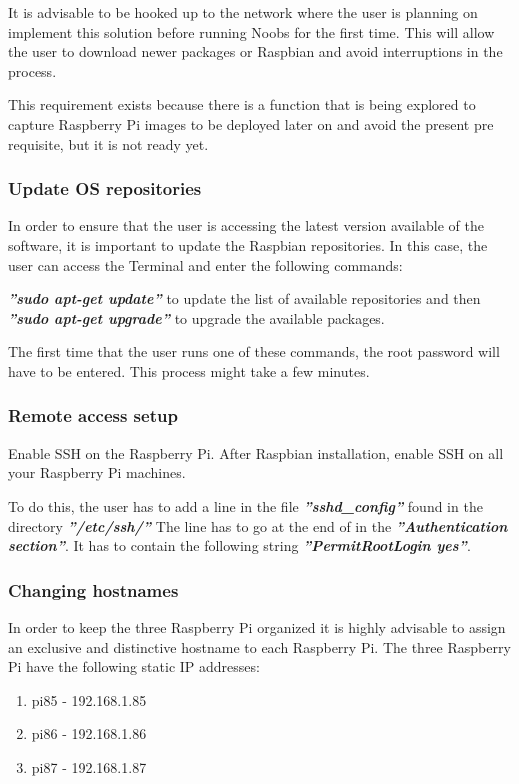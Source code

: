 	It is advisable to be hooked up to the network where the user is planning on implement this solution before running Noobs for the first time. This will allow the user to download newer packages or Raspbian and avoid interruptions in the process.	
		
	This requirement exists because there is a function that is being explored to capture Raspberry Pi images to be deployed later on and avoid the present pre requisite, but it is not ready yet.
	
	\subsubsection{Update OS repositories}
	In order to ensure that the user is accessing the latest version available of the software, it is important to update the Raspbian repositories. 
	In this case, the user can access the Terminal and enter the following commands:
	
		\textbf{\textit{''sudo apt-get update''}} to update the list of available repositories
	and then 	\textbf{\textit{''sudo apt-get upgrade''}} to upgrade the available packages.
	
	The first time that the user runs one of these commands, the root password will have to be entered.
	This process might take a few minutes. \cite{debianpackage}
	
	\subsubsection{Remote access setup}
	Enable SSH on the Raspberry Pi.
	After Raspbian installation, enable SSH on all your Raspberry Pi machines. 
	
	To do this, the user has to add a line in the file \textbf{\textit{''sshd\_config''}} found in the directory \textbf{\textit{''/etc/ssh/''}} 
	The line has to go at the end of in the \textbf{\textit{''Authentication section''}}. 
	It has to contain the following string \textbf{\textit{''PermitRootLogin yes''}}.
	\cite{rootSsh}
	
	\subsubsection{Changing hostnames}
	In order to keep the three Raspberry Pi organized it is highly advisable to assign an exclusive and distinctive hostname to each Raspberry Pi.
The three Raspberry Pi have the following static IP addresses:

\begin{enumerate}
	\item pi85 -  192.168.1.85
	\item pi86 -  192.168.1.86
	\item pi87 -  192.168.1.87
\end{enumerate}

